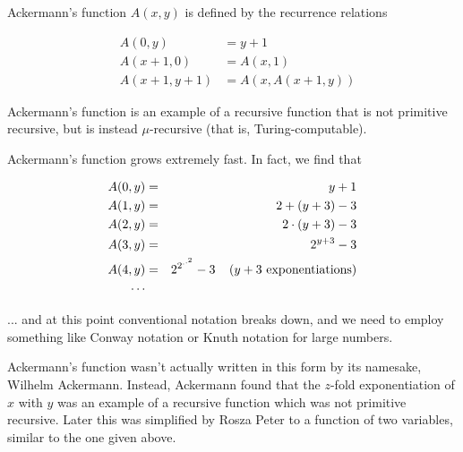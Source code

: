 \documentclass[12pt]{article}
\begin{document}
Ackermann's function $A(x,y)$ is defined by the recurrence relations

\begin{eqnarray*}
& A(0,y) & = y + 1  \\
& A(x+1,0) & = A(x,1)  \\
& A(x+1,y+1) & = A(x,A(x+1,y)) 
\end{eqnarray*}

Ackermann's function is an example of a recursive function that is not primitive recursive, but is instead $\mu$-recursive (that is, Turing-computable).

Ackermann's function grows extremely fast.  In fact, we find that

\begin{eqnarray*}
A(0,y) & = & y + 1 \\
A(1,y) & = & 2+(y+3) -3 \\
A(2,y) & = & 2\cdot (y+3) - 3 \\
A(3,y) & = & 2^{y+3} - 3 \\
A(4,y) & = & 2^{2^{{\ldotp\cdotp}^2}} - 3  \;\;\;\; (y + 3 \text{ exponentiations})\\
\cdots
\end{eqnarray*}

... and at this point conventional notation breaks down, and we need to employ something like Conway notation or Knuth notation for large numbers.

Ackermann's function wasn't actually written in this form by its namesake, Wilhelm Ackermann.  Instead, Ackermann found that the $z$-fold exponentiation of $x$ with $y$ was an example of a recursive function which was not primitive recursive.  Later this was simplified by Rosza Peter to a function of two variables, similar to the one given above.
\end{document}
